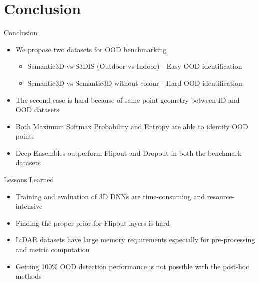 \documentclass[aspectratio=169]{beamer}
\begin{document}
\section{Conclusion}
\begin{frame}{Conclusion}
    \begin{itemize}
        \item We propose two datasets for OOD benchmarking
        \begin{itemize}
            \item Semantic3D-vs-S3DIS (Outdoor-vs-Indoor) - Easy OOD identification
            \item Semantic3D-vs-Semantic3D without colour - Hard OOD identification
        \end{itemize}
        \item The second case is hard because of same point geometry between ID and OOD datasets
        \item Both Maximum Softmax Probability and Entropy are able to identify OOD points
        \item Deep Ensembles outperform Flipout and Dropout in both the benchmark datasets
    \end{itemize}
\end{frame}
\begin{frame}{Lessons Learned}
    \begin{itemize}
        \item Training and evaluation of 3D DNNs are time-consuming and resource-intensive
        \item Finding the proper prior for Flipout layers is hard
        \item LiDAR datasets have large memory requirements especially for pre-processing and metric computation
        \item Getting 100\% OOD detection performance is not possible with the post-hoc methods 
    \end{itemize}
\end{frame}
\end{document}
